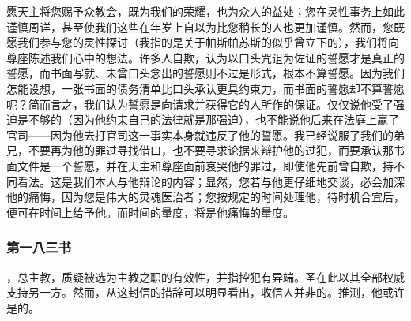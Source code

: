 愿天主将您赐予众教会，既为我们的荣耀，也为众人的益处；您在灵性事务上如此谨慎周详，甚至使我们这些在年岁上自以为比您稍长的人也更加谨慎。然而，您既愿我们参与您的灵性探讨（我指的是关于帕斯帕苏斯的似乎曾立下的），我们将向尊座陈述我们心中的想法。许多人自欺，认为以口头咒诅为佐证的誓愿才是真正的誓愿，而书面写就、未曾口头念出的誓愿则不过是形式，根本不算誓愿。因为我们怎能设想，一张书面的债务清单比口头承认更具约束力，而书面的誓愿却不算誓愿呢？简而言之，我们认为誓愿是向请求并获得它的人所作的保证。仅仅说他受了强迫是不够的（因为他约束自己的法律就是那强迫），也不能说他后来在法庭上赢了官司——因为他去打官司这一事实本身就违反了他的誓愿。我已经说服了我们的弟兄，不要再为他的罪过寻找借口，也不要寻求论据来辩护他的过犯，而要承认那书面文件是一个誓愿，并在天主和尊座面前哀哭他的罪过，即使他先前曾自欺，持不同看法。这是我们本人与他辩论的内容；显然，您若与他更仔细地交谈，必会加深他的痛悔，因为您是伟大的灵魂医治者；您按规定的时间处理他，待时机合宜后，便可在时间上给予他。而时间的量度，将是他痛悔的量度。\par


\subsubsection{第一八三书}

，总主教，质疑被选为主教之职的有效性，并指控犯有异端。圣在此以其全部权威支持另一方。然而，从这封信的措辞可以明显看出，收信人并非的。推测，他或许是的。\par

